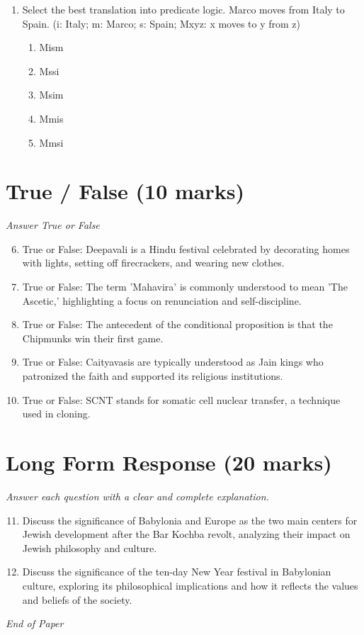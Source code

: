\documentclass[12pt]{article}
\begin{document}
\begin{enumerate}[label=\arabic*.]
\begin{enumerate}[label=(\alph*)]
    \item are the same as behavioral states
    \item exist
    \item can be directly observed
    \item are always visible
\end{enumerate}
\item Select the best translation into predicate logic. Marco moves from Italy to Spain. (i: Italy; m: Marco; s: Spain; Mxyz: x moves to y from z)
\begin{enumerate}[label=(\alph*)]
    \item Mism
    \item Mssi
    \item Msim
    \item Mmis
    \item Mmsi
\end{enumerate}
\end{enumerate}

\section*{True / False (10 marks)}
\textit{Answer True or False}
\begin{enumerate}[label=\arabic*.]
\setcounter{enumi}{5}
\item True or False: Deepavali is a Hindu festival celebrated by decorating homes with lights, setting off firecrackers, and wearing new clothes.
\item True or False: The term 'Mahavira' is commonly understood to mean 'The Ascetic,' highlighting a focus on renunciation and self-discipline.
\item True or False: The antecedent of the conditional proposition is that the Chipmunks win their first game.
\item True or False: Caityavasis are typically understood as Jain kings who patronized the faith and supported its religious institutions.
\item True or False: SCNT stands for somatic cell nuclear transfer, a technique used in cloning.
\end{enumerate}

\section*{Long Form Response (20 marks)}
\textit{Answer each question with a clear and complete explanation.}
\begin{enumerate}[label=\arabic*.]
\setcounter{enumi}{10}
\item Discuss the significance of Babylonia and Europe as the two main centers for Jewish development after the Bar Kochba revolt, analyzing their impact on Jewish philosophy and culture.
\item Discuss the significance of the ten-day New Year festival in Babylonian culture, exploring its philosophical implications and how it reflects the values and beliefs of the society.
\end{enumerate}

\vfill
\noindent\textit{End of Paper}
\end{document}
